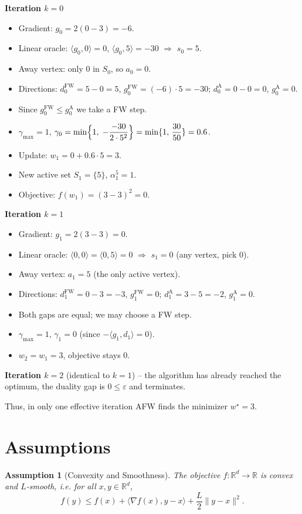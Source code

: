 \documentclass{article}
\newtheorem{assumption}{Assumption}
\begin{document}
\medskip
\noindent\textbf{Iteration $k=0$}
\begin{itemize}
\item Gradient: $g_{0}=2(0-3)=-6$.
\item Linear oracle: $\langle g_{0},0\rangle=0$, $\langle g_{0},5\rangle=-30$ $\Rightarrow$ $s_{0}=5$.
\item Away vertex: only $0$ in $S_{0}$, so $a_{0}=0$.
\item Directions: $d^{\mathrm{FW}}_{0}=5-0=5$, $g^{\mathrm{FW}}_{0}=(-6)\cdot5=-30$; 
$d^{\mathrm{A}}_{0}=0-0=0$, $g^{\mathrm{A}}_{0}=0$.
\item Since $g^{\mathrm{FW}}_{0}\le g^{\mathrm{A}}_{0}$ we take a FW step.
\item $\gamma_{\max}=1$, $\displaystyle\gamma_{0}= \min\Bigl\{1,\;-\frac{-30}{2\cdot5^{2}}\Bigr\}= \min\{1,\,\frac{30}{50}\}=0.6$.
\item Update: $w_{1}=0+0.6\cdot5=3$.
\item New active set $S_{1}=\{5\}$, $\alpha_{1}^{5}=1$.
\item Objective: $f(w_{1})=(3-3)^{2}=0$.
\end{itemize}

\medskip
\noindent\textbf{Iteration $k=1$}
\begin{itemize}
\item Gradient: $g_{1}=2(3-3)=0$.
\item Linear oracle: $\langle 0,0\rangle=\langle 0,5\rangle=0$ $\Rightarrow$ $s_{1}=0$ (any vertex, pick $0$).
\item Away vertex: $a_{1}=5$ (the only active vertex).
\item Directions: $d^{\mathrm{FW}}_{1}=0-3=-3$, $g^{\mathrm{FW}}_{1}=0$; $d^{\mathrm{A}}_{1}=3-5=-2$, $g^{\mathrm{A}}_{1}=0$.
\item Both gaps are equal; we may choose a FW step.
\item $\gamma_{\max}=1$, $\gamma_{1}=0$ (since $-\langle g_{1},d_{1}\rangle=0$).
\item $w_{2}=w_{1}=3$, objective stays $0$.
\end{itemize}

\medskip
\noindent\textbf{Iteration $k=2$} (identical to $k=1$) – the algorithm has already reached the optimum, the duality gap is $0\le\varepsilon$ and terminates.

Thus, in only one effective iteration AFW finds the minimizer $w^{\star}=3$.

\newpage
\section*{Assumptions}
\begin{assumption}[Convexity and Smoothness]\label{as:convexsmooth}
The objective $f:\mathbb{R}^{d}\to\mathbb{R}$ is convex and $L$‑smooth, i.e. for all $x,y\in\mathbb{R}^{d}$,
\[
f(y)\le f(x)+\langle\nabla f(x),y-x\rangle+\frac{L}{2}\|y-x\|^{2}.
\]
\end{assumption}
\end{document}
